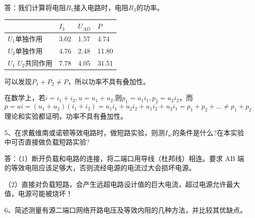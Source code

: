 \documentclass[12pt,a4paper]{article}
\begin{document}
答：我们计算将电阻$R_{5}$接入电路时，电阻$R_{3}$的功率。

\begin{table}[H]
\centering

\renewcommand{\arraystretch}{1.2}
\footnotesize
\begin{tabular}{|p{2.6cm}|p{1cm}|p{1cm}|p{1cm}|}
\hline
 & $I_{3}$  & $U_{AD}$ & $P$   \\
\hline
$U_{1}$单独作用  &3.02  &1.57 &4.74  \\
\hline
$U_{2}$单独作用  &4.76  &2.48 &11.80  \\
\hline
$U_{1}$ $U_{2}$共同作用 &7.78  &4.05 &31.51  \\
\hline
\end{tabular}

\end{table}

可以发现$P_{1}+P_{2}\neq P$，所以功率不具有叠加性。

在数学上，若$i=i_{1}+i_{2},u=u_{1}+u_{2}$,则$p_{1}=u_{1}i_{1},p_{2}=u_{2}i_{2}$，而
$$p=ui=(u_{1}+u_{2})(i_{1}+i_{2})=u_{1}i_{1}+u_{2}i_{2}+u_{1}i_{2}+u_{2}i_{1}=p_{1}+p_{2}+...\neq p_{1}+p_{2}$$
理论和实验都证明，功率不具有叠加性。

5、在求戴维南或诺顿等效电路时，做短路实验，则测$I_{sc}$的条件是什么?在本实验中可否直接做负载短路实验?

答：（1）断开负载和电路的连接，将二端口用导线（杜邦线）相连。要求 AB 端的等效电阻应该足够大，否则流经电源的电流过大会损坏电源。

（2）直接对负载短路，会产生远超电路设计值的巨大电流，超过电源允许最大值，电源可能被烧坏！

6、简述测量有源二端口网络开路电压及等效内阻的几种方法，并比较其优缺点。 
\end{document}
